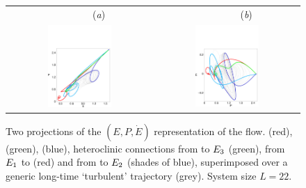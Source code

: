 \begin{figure}[h!t]
\begin{center}
 \begin{tabular}{cc}
        ~~~~~~~~(\textit{a})                        &   ~~~~~~~~(\textit{b}) \\
    \includegraphics[width=0.46\textwidth]{../figs/connEP}
  & \includegraphics[width=0.46\textwidth]{../figs/connPEdot}
 \end{tabular}
\end{center}
\caption[Projections of the $(E,P,\dot{E})$ representation of the flow]{
Two projections of the $(E,P,\dot{E})$ representation of the flow.
 (red),  (green),  (blue),
heteroclinic connections from  to $E_{3}$ (green),
from $E_{1}$ to  (red)
and from  to $E_{2}$ (shades of blue), superimposed over
a generic long-time `turbulent' trajectory (grey).
System size $L=22$.
        }
\label{f:drivedragConn}
\end{figure}

